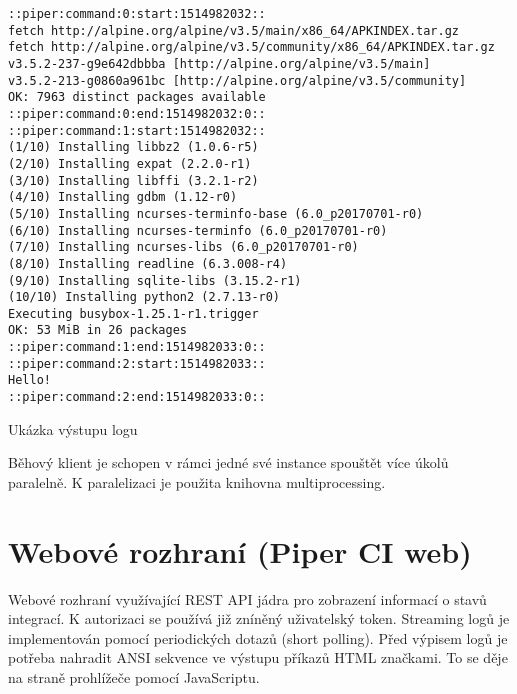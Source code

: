 \begin{listing}[ht]
\begin{verbatim}
::piper:command:0:start:1514982032::
fetch http://alpine.org/alpine/v3.5/main/x86_64/APKINDEX.tar.gz
fetch http://alpine.org/alpine/v3.5/community/x86_64/APKINDEX.tar.gz
v3.5.2-237-g9e642dbbba [http://alpine.org/alpine/v3.5/main]
v3.5.2-213-g0860a961bc [http://alpine.org/alpine/v3.5/community]
OK: 7963 distinct packages available
::piper:command:0:end:1514982032:0::
::piper:command:1:start:1514982032::
(1/10) Installing libbz2 (1.0.6-r5)
(2/10) Installing expat (2.2.0-r1)
(3/10) Installing libffi (3.2.1-r2)
(4/10) Installing gdbm (1.12-r0)
(5/10) Installing ncurses-terminfo-base (6.0_p20170701-r0)
(6/10) Installing ncurses-terminfo (6.0_p20170701-r0)
(7/10) Installing ncurses-libs (6.0_p20170701-r0)
(8/10) Installing readline (6.3.008-r4)
(9/10) Installing sqlite-libs (3.15.2-r1)
(10/10) Installing python2 (2.7.13-r0)
Executing busybox-1.25.1-r1.trigger
OK: 53 MiB in 26 packages
::piper:command:1:end:1514982033:0::
::piper:command:2:start:1514982033::
Hello!
::piper:command:2:end:1514982033:0::
\end{verbatim}
\caption{Ukázka výstupu logu}
\end{listing}

Běhový klient je schopen v rámci jedné své instance spouštět více úkolů paralelně.
K paralelizaci je použita knihovna multiprocessing.

\section{Webové rozhraní (Piper CI web)}

Webové rozhraní využívající REST API jádra pro zobrazení informací o stavů integrací.
K autorizaci se používá již zníněný uživatelský token.
Streaming logů je implementován pomocí periodických dotazů (short polling).
Před výpisem logů je potřeba nahradit ANSI sekvence ve výstupu příkazů HTML značkami.
To se děje na straně prohlížeče pomocí JavaScriptu.



